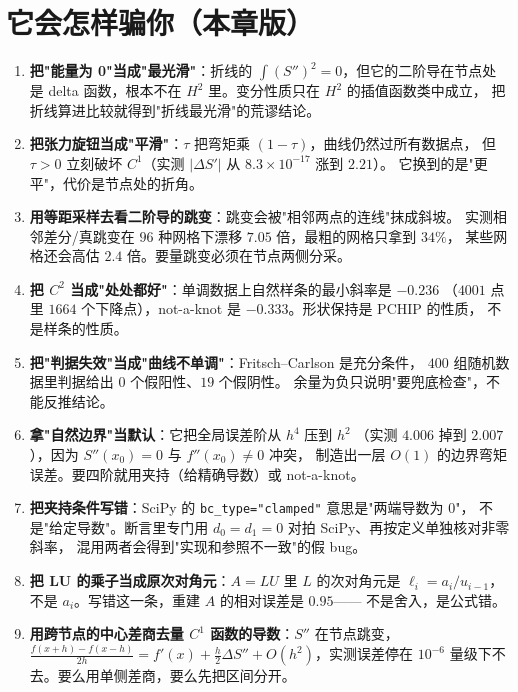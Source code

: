 \section{它会怎样骗你（本章版）}

\begin{enumerate}
  \item \textbf{把"能量为 0"当成"最光滑"}：折线的 $\int(S'')^2=0$，但它的二阶导在节点处
        是 delta 函数，根本不在 $H^2$ 里。变分性质只在 $H^2$ 的插值函数类中成立，
        把折线算进比较就得到"折线最光滑"的荒谬结论。
  \item \textbf{把张力旋钮当成"平滑"}：$\tau$ 把弯矩乘 $(1-\tau)$，曲线仍然过所有数据点，
        但 $\tau>0$ 立刻破坏 $C^1$（实测 $|\Delta S'|$ 从 $8.3\times10^{-17}$ 涨到 $2.21$）。
        它换到的是"更平"，代价是节点处的折角。
  \item \textbf{用等距采样去看二阶导的跳变}：跳变会被"相邻两点的连线"抹成斜坡。
        实测相邻差分/真跳变在 $96$ 种网格下漂移 $7.05$ 倍，最粗的网格只拿到 $34\%$，
        某些网格还会高估 $2.4$ 倍。要量跳变必须在节点两侧分采。
  \item \textbf{把 $C^2$ 当成"处处都好"}：单调数据上自然样条的最小斜率是 $-0.236$
        （$4001$ 点里 $1664$ 个下降点），not-a-knot 是 $-0.333$。形状保持是 PCHIP 的性质，
        不是样条的性质。
  \item \textbf{把"判据失效"当成"曲线不单调"}：Fritsch--Carlson 是充分条件，
        $400$ 组随机数据里判据给出 $0$ 个假阳性、$19$ 个假阴性。
        余量为负只说明"要兜底检查"，不能反推结论。
  \item \textbf{拿"自然边界"当默认}：它把全局误差阶从 $h^4$ 压到 $h^2$
        （实测 $4.006$ 掉到 $2.007$），因为 $S''(x_0)=0$ 与 $f''(x_0)\ne0$ 冲突，
        制造出一层 $O(1)$ 的边界弯矩误差。要四阶就用夹持（给精确导数）或 not-a-knot。
  \item \textbf{把夹持条件写错}：SciPy 的 \texttt{bc\_type="clamped"} 意思是"两端导数为 $0$"，
        不是"给定导数"。断言里专门用 $d_0=d_1=0$ 对拍 SciPy、再按定义单独核对非零斜率，
        混用两者会得到"实现和参照不一致"的假 bug。
  \item \textbf{把 LU 的乘子当成原次对角元}：$A=LU$ 里 $L$ 的次对角元是
        $\ell_i=a_i/u_{i-1}$，不是 $a_i$。写错这一条，重建 $A$ 的相对误差是 $0.95$——
        不是舍入，是公式错。
  \item \textbf{用跨节点的中心差商去量 $C^1$ 函数的导数}：$S''$ 在节点跳变，
        $\frac{f(x+h)-f(x-h)}{2h}=f'(x)+\frac h2\Delta S''+O(h^2)$，实测误差停在
        $10^{-6}$ 量级下不去。要么用单侧差商，要么先把区间分开。

\end{enumerate}

